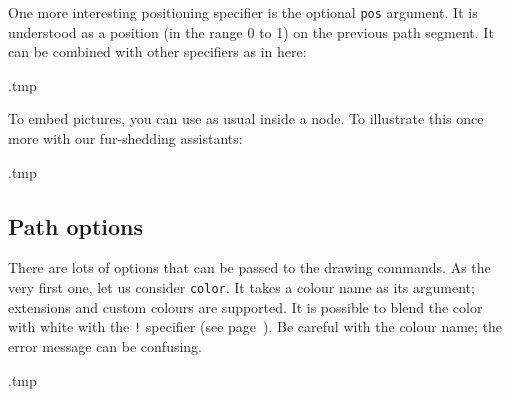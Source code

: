 One more interesting positioning specifier is the optional \verb|pos| argument.
It is understood as a position (in the range 0 to 1) on the previous path segment.
It can be combined with other specifiers as in here:
%
\begin{VerbatimOut}{\jobname.tmp}
\end{VerbatimOut}
\ShowExample

To embed pictures,
you can use  as usual inside a node.
To illustrate this once more with our fur-shedding assistants:
%
\begin{VerbatimOut}{\jobname.tmp}
\centering
\newcommand{\dogfile}{pictures/TheDogs.jpg}
\end{VerbatimOut}
\ShowExampleBelow[2]


%
%
\subsection{Path options}

There are lots of options that can be passed to the drawing commands.
As the very first one, let us consider \verb|color|.
It takes a colour name as its argument;
 extensions and custom colours are supported.
It is possible to blend the color with white with the \verb|!| specifier
(see page~\pageref{ex:color blending}).
Be careful with the colour name; the error message can be confusing.
%
\begin{VerbatimOut}{\jobname.tmp}
\end{VerbatimOut}
\ShowExample

